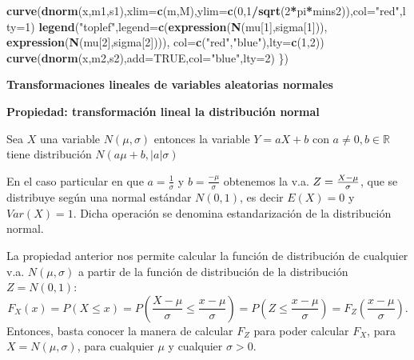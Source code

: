 \documentclass[]{book}
\newenvironment{Shaded}{\begin{snugshade}}{\end{snugshade}}
\newcommand{\DataTypeTok}[1]{\textcolor[rgb]{0.13,0.29,0.53}{#1}}
\newcommand{\DecValTok}[1]{\textcolor[rgb]{0.00,0.00,0.81}{#1}}
\newcommand{\KeywordTok}[1]{\textcolor[rgb]{0.13,0.29,0.53}{\textbf{#1}}}
\newcommand{\NormalTok}[1]{#1}
\newcommand{\OperatorTok}[1]{\textcolor[rgb]{0.81,0.36,0.00}{\textbf{#1}}}
\newcommand{\OtherTok}[1]{\textcolor[rgb]{0.56,0.35,0.01}{#1}}
\newcommand{\StringTok}[1]{\textcolor[rgb]{0.31,0.60,0.02}{#1}}
\begin{document}
\begin{Shaded}
\begin{Highlighting}[]
\KeywordTok{curve}\NormalTok{(}\KeywordTok{dnorm}\NormalTok{(x,m1,s1),}\DataTypeTok{xlim=}\KeywordTok{c}\NormalTok{(m,M),}\DataTypeTok{ylim=}\KeywordTok{c}\NormalTok{(}\DecValTok{0}\NormalTok{,}\DecValTok{1}\OperatorTok{/}\KeywordTok{sqrt}\NormalTok{(}\DecValTok{2}\OperatorTok{*}\NormalTok{pi}\OperatorTok{*}\NormalTok{mins2)),}\DataTypeTok{col=}\StringTok{"red"}\NormalTok{,}\DataTypeTok{lty=}\DecValTok{1}\NormalTok{)}
\KeywordTok{legend}\NormalTok{(}\StringTok{"toplef"}\NormalTok{,}\DataTypeTok{legend=}\KeywordTok{c}\NormalTok{(}\KeywordTok{expression}\NormalTok{(}\KeywordTok{N}\NormalTok{(mu[}\DecValTok{1}\NormalTok{],sigma[}\DecValTok{1}\NormalTok{])),}
                         \KeywordTok{expression}\NormalTok{(}\KeywordTok{N}\NormalTok{(mu[}\DecValTok{2}\NormalTok{],sigma[}\DecValTok{2}\NormalTok{]))),}
       \DataTypeTok{col=}\KeywordTok{c}\NormalTok{(}\StringTok{"red"}\NormalTok{,}\StringTok{"blue"}\NormalTok{),}\DataTypeTok{lty=}\KeywordTok{c}\NormalTok{(}\DecValTok{1}\NormalTok{,}\DecValTok{2}\NormalTok{))}
\KeywordTok{curve}\NormalTok{(}\KeywordTok{dnorm}\NormalTok{(x,m2,s2),}\DataTypeTok{add=}\OtherTok{TRUE}\NormalTok{,}\DataTypeTok{col=}\StringTok{"blue"}\NormalTok{,}\DataTypeTok{lty=}\DecValTok{2}\NormalTok{)}
\NormalTok{\})}
\end{Highlighting}
\end{Shaded}

\textbf{Transformaciones lineales de variables aleatorias normales}

 \textbf{Propiedad: transformación lineal la distribución normal}

Sea \(X\) una variable \(N(\mu,\sigma)\) entonces la variable \(Y=a X+b\) con
\(a\not=0,b\in\mathbb{R}\) tiene distribución \(N(a\mu+b, |a| \sigma)\)

En el caso particular en que \(a=\frac1{\sigma}\) y \(b= \frac{-\mu}{\sigma}\) obtenemos la v.a. \(Z={{X-\mu}\over {\sigma}}\), que
se distribuye según una normal estándar \(N(0,1)\), es decir \(E(X)=0\) y \(Var(X)=1\). Dicha operación se denomina estandarización de la
distribución normal.

La propiedad anterior nos permite calcular la función de distribución de cualquier v.a. \(N(\mu,\sigma)\) a partir de la función de distribución de la distribución \(Z=N(0,1)\):
\[
F_X(x)=P(X\leq x)=P\left(\frac{X-\mu}{\sigma}\leq \frac{x-\mu}{\sigma}\right)=P\left(Z\leq \frac{x-\mu}{\sigma}\right)=F_Z \left(\frac{x-\mu}{\sigma}\right).
\]
Entonces, basta conocer la manera de calcular \(F_Z\) para poder calcular \(F_X\), para \(X=N(\mu,\sigma)\), para cualquier \(\mu\) y cualquier \(\sigma>0\).
\end{document}

